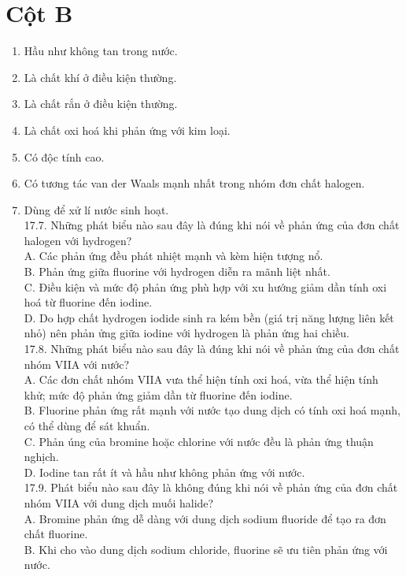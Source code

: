 \documentclass[10pt]{article}
\begin{document}
\section*{Cột B}
\begin{enumerate}
  \item Hầu như không tan trong nước.
  \item Là chất khí ở điều kiện thường.
  \item Là chất rắn ở điều kiện thường.
  \item Là chất oxi hoá khi phản ứng với kim loại.
  \item Có độc tính cao.
  \item Có tương tác van der Waals mạnh nhất trong nhóm đơn chất halogen.
  \item Dùng để xử lí nước sinh hoạt.\\
17.7. Những phát biểu nào sau đây là đúng khi nói về phản ứng của đơn chất halogen với hydrogen?\\
A. Các phản ứng đều phát nhiệt mạnh và kèm hiện tượng nổ.\\
B. Phản ứng giữa fluorine với hydrogen diễn ra mãnh liệt nhất.\\
C. Điều kiện và mức độ phản ứng phù hợp với xu hướng giảm dần tính oxi hoá từ fluorine đến iodine.\\
D. Do hợp chất hydrogen iodide sinh ra kém bền (giá trị năng lượng liên kết nhỏ) nên phản ửng giữa iodine với hydrogen là phản ứng hai chiều.\\
17.8. Những phát biểu nào sau đây là đúng khi nói về phản ứng của đơn chất nhóm VIIA với nước?\\
A. Các đơn chất nhóm VIIA vưa thể hiện tính oxi hoá, vừa thể hiện tính khử; mức độ phản ứng giảm dần từ fluorine đến iodine.\\
B. Fluorine phản ứng rất mạnh với nước tạo dung dịch có tính oxi hoá mạnh, có thể dùng để sát khuẩn.\\
C. Phản úng của bromine hoặc chlorine với nước đều là phản ứng thuận nghịch.\\
D. Iodine tan rất ít và hầu như không phản ứng với nước.\\
17.9. Phát biểu nào sau đây là không đúng khi nói về phản ứng của đơn chất nhóm VIIA với dung dịch muối halide?\\
A. Bromine phản ứng dễ dàng với dung dịch sodium fluoride để tạo ra đơn chất fluorine.\\
B. Khi cho vào dung dịch sodium chloride, fluorine sẽ ưu tiên phản ứng với nước.\\

\end{enumerate}
\end{document}
